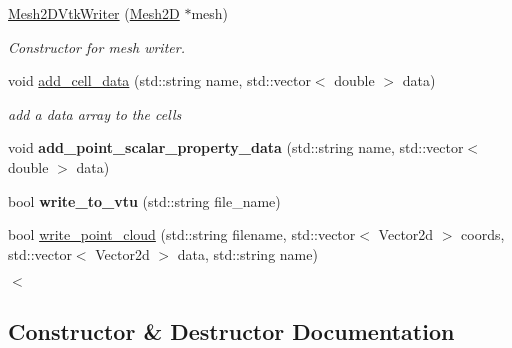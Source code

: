 \begin{DoxyCompactItemize}
\hyperlink{classMeshFramework2D_1_1Mesh2DVtkWriter_a323326d3765fe1da21130de403d0b6b0}{Mesh2\+D\+Vtk\+Writer} (\hyperlink{classMeshFramework2D_1_1Mesh2D}{Mesh2D} $\ast$mesh)
\begin{DoxyCompactList}\small\item\em Constructor for mesh writer. \end{DoxyCompactList}\item 
void \hyperlink{classMeshFramework2D_1_1Mesh2DVtkWriter_aebb67019f770f5310720d765a2f7a3f0}{add\+\_\+cell\+\_\+data} (std\+::string name, std\+::vector$<$ double $>$ data)
\begin{DoxyCompactList}\small\item\em add a data array to the cells \end{DoxyCompactList}\item 
\mbox{\label{classMeshFramework2D_1_1Mesh2DVtkWriter_acf005302029229aab24af2034524b89e}} 
void {\bfseries add\+\_\+point\+\_\+scalar\+\_\+property\+\_\+data} (std\+::string name, std\+::vector$<$ double $>$ data)
\item 
\mbox{\label{classMeshFramework2D_1_1Mesh2DVtkWriter_a291d0606b5762a86af64b7da4a59a5c9}} 
bool {\bfseries write\+\_\+to\+\_\+vtu} (std\+::string file\+\_\+name)
\item 
bool \hyperlink{classMeshFramework2D_1_1Mesh2DVtkWriter_a79f4eec04164529c3f6f3910192c1a48}{write\+\_\+point\+\_\+cloud} (std\+::string filename, std\+::vector$<$ Vector2d $>$ coords, std\+::vector$<$ Vector2d $>$ data, std\+::string name)
\begin{DoxyCompactList}\small\item\em $<$ \end{DoxyCompactList}\end{DoxyCompactItemize}


\subsection{Constructor \& Destructor Documentation}
\mbox{\label{classMeshFramework2D_1_1Mesh2DVtkWriter_a45a63d26a0eb5086bdc5b5ec7bd672d6}} 
